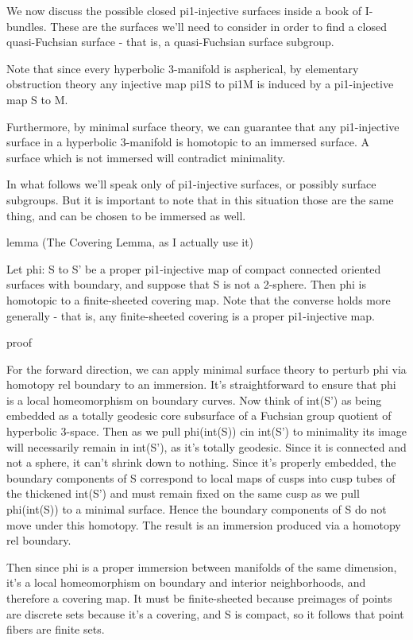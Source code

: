 We now discuss the possible closed pi1-injective surfaces inside a book of
I-bundles. These are the surfaces we'll need to consider in order to find
a closed quasi-Fuchsian surface - that is, a quasi-Fuchsian surface subgroup.

Note that since every hyperbolic 3-manifold is aspherical, by elementary
obstruction theory any injective map pi1S to pi1M is induced by a pi1-injective
map S to M.

Furthermore, by minimal surface theory, we can guarantee that any pi1-injective
surface in a hyperbolic 3-manifold is homotopic to an immersed surface.
A surface which is not immersed will contradict minimality.

In what follows we'll speak only of pi1-injective surfaces, or possibly surface
subgroups. But it is important to note that in this situation those are the
same thing, and can be chosen to be immersed as well.

lemma (The Covering Lemma, as I actually use it)

Let phi: S to S' be a proper pi1-injective map of compact connected oriented
surfaces with boundary, and suppose that S is not a 2-sphere.  Then phi is
homotopic to a finite-sheeted covering map.  Note that the converse holds more
generally - that is, any finite-sheeted covering is a proper pi1-injective map.

proof

For the forward direction, we can apply minimal surface theory to perturb phi
via homotopy rel boundary to an immersion. It's straightforward to ensure that
phi is a local homeomorphism on boundary curves. Now think of int(S') as being
embedded as a totally geodesic core subsurface of a Fuchsian group quotient of
hyperbolic 3-space.  Then as we pull phi(int(S)) cin int(S')  to minimality its
image will necessarily remain in int(S'), as it's totally geodesic.  Since it
is connected and not a sphere, it can't shrink down to nothing. Since it's
properly embedded, the boundary components of S correspond to local maps of
cusps into cusp tubes of the thickened int(S') and must remain fixed on the
same cusp as we pull phi(int(S)) to a minimal surface. Hence the boundary
components of S do not move under this homotopy. The result is an immersion
produced via a homotopy rel boundary.

Then since phi is a proper immersion between manifolds of the same dimension,
it's a local homeomorphism on boundary and interior neighborhoods, and
therefore a covering map. It must be finite-sheeted because preimages of points
are discrete sets because it's a covering, and S is compact, so it follows that
point fibers are finite sets.

